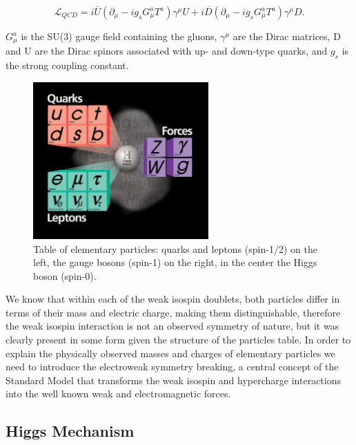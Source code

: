 \begin{equation}
\mathcal{L}_{QCD} = i\overline U (\partial_\mu-ig_sG_\mu^a T^a)\gamma^\mu U + i\overline D (\partial_\mu-i g_s G_\mu^a T^a)\gamma^\mu D.
\label{eqn:LagrQCD}
\end{equation}

$G_\mu^a$ is the SU(3) gauge field containing the gluons, $\gamma^\mu$ are the Dirac matrices,
 D and U are the Dirac spinors associated with up- and down-type quarks, and $g_s$ 
is the strong coupling constant.

\begin{figure}
\centering
\includegraphics[width=0.6\textwidth]{plots/intro/Higgs_SM.jpeg}
\caption{Table of elementary particles: quarks and leptons (spin-1/2) on the left,
the gauge bosons (spin-1) on the right, in the center the Higgs boson (spin-0).
\label{fig:parttable}}

\end{figure}

We know that within each of the weak isospin doublets, both particles 
differ in terms of their
mass and electric charge, making them distinguishable,
 therefore the weak isospin interaction is
 not an observed symmetry of nature, but it was clearly present
in some form given the structure of the particles table. 
In order to explain the physically observed masses and charges of elementary
 particles we need to introduce the electroweak symmetry breaking, a central concept
of the Standard Model that transforms the
weak isospin and hypercharge interactions into the well known weak and electromagnetic forces.



\subsection{Higgs Mechanism}

